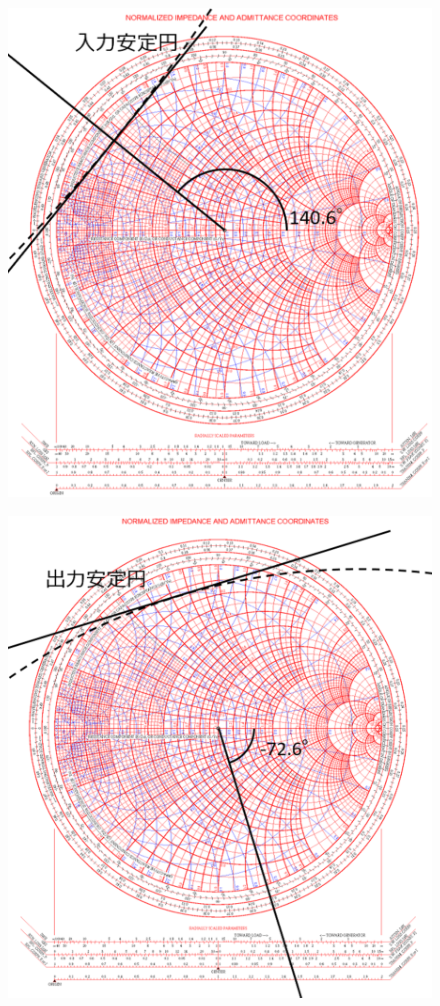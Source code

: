 \setcounter{figure}{1}
\begin{figure}[p]
    \begin{center}
        \includegraphics[width=175mm]{./figures/section/2.eps}
        \caption{}
    \end{center}
\end{figure}
\clearpage
\setcounter{figure}{2}
\begin{figure}[p]
    \begin{center}
        \includegraphics[width=175mm]{./figures/section/3.eps}
        \caption{}
    \end{center}
\end{figure}